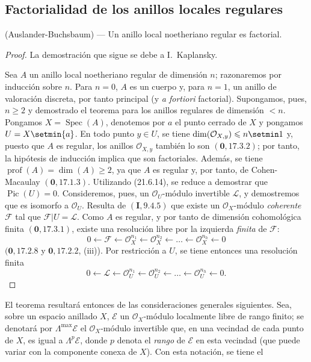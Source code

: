 \subsection{Factorialidad de los anillos locales regulares}
\label{subsection:IV.21.11}
\label{IV.21.11}

\begin{theorem}[21.11.1]
\label{IV.21.11.1}
\textup{(Auslander-Buchsbaum)} ---
Un anillo local noetheriano regular es factorial.
\end{theorem}

\begin{proof}
La demostración que sigue se debe a I.~Kaplansky.

Sea $A$ un anillo local noetheriano regular de dimensión $n$; razonaremos
por inducción sobre $n$. Para $n=0$, $A$ es un cuerpo y, para $n=1$, un anillo de
valoración discreta, por tanto principal (y \emph{a fortiori} factorial). Supongamos, pues,
$n\geq2$ y demostrado el teorema para los anillos regulares de dimensión $<n$.
Pongamos $X=\operatorname{Spec}(A)$, denotemos por $a$ el punto cerrado de $X$ y pongamos
$U=X\setmin\{a\}$. En todo punto $y\in U$, se tiene
$\dim(\mathcal O_{X,y})\leq n\setmin 1$ y, puesto que $A$ es regular, los anillos
$\mathcal O_{X,y}$ también lo son $(\mathbf 0, 17.3.2)$; por tanto, la hipótesis de
inducción implica que son factoriales. Además, se tiene
$\operatorname{prof}(A)=\dim(A)\geq2$, ya que $A$ es regular y, por tanto, de
Cohen-Macaulay $(\mathbf 0, 17.1.3)$.
Utilizando (21.6.14), se reduce a demostrar que $\operatorname{Pic}(U)=0$.
Consideremos, pues, un $\mathcal O_U$-módulo invertible $\mathscr L$, y demostremos que es
isomorfo a $\mathcal O_U$. Resulta de $(\mathbf I, 9.4.5)$ que existe un
$\mathcal O_X$-módulo \emph{coherente} $\mathscr F$ tal que
$\mathscr F|U=\mathscr L$. Como $A$ es regular, y por tanto de dimensión cohomológica
finita $(\mathbf 0, 17.3.1)$, existe una resolución libre por la izquierda \emph{finita} de
$\mathscr F$:
\[
  0\leftarrow\mathscr F\leftarrow\mathcal O_X^{n_1}
  \leftarrow\mathcal O_X^{n_2}\leftarrow\ldots
  \leftarrow\mathcal O_X^{n_h}\leftarrow0
\]
$(\mathbf 0, 17.2.8$ y $\mathbf 0, 17.2.2$, (iii)). Por restricción a $U$, se tiene
entonces una resolución finita
\[
\label{IV.21.11.1.1}
  0\leftarrow\mathscr L\leftarrow\mathcal O_U^{n_1}
  \leftarrow\mathcal O_U^{n_2}\leftarrow\ldots
  \leftarrow\mathcal O_U^{n_h}\leftarrow0.
  \tag{21.11.1.1}
\]
\end{proof}

El teorema resultará entonces de las consideraciones generales siguientes. Sea,
sobre un espacio anillado $X$, $\mathscr E$ un $\mathcal O_X$-módulo localmente libre de rango finito;
se denotará por $\Lambda^{\max}\mathscr E$ el $\mathcal O_X$-módulo invertible que,
en una vecindad de cada punto de $X$, es igual a $\Lambda^p\mathscr E$, donde
$p$ denota el \emph{rango} de $\mathscr E$ en esta vecindad (que puede variar con la componente
conexa de $X$). Con esta notación, se tiene el

